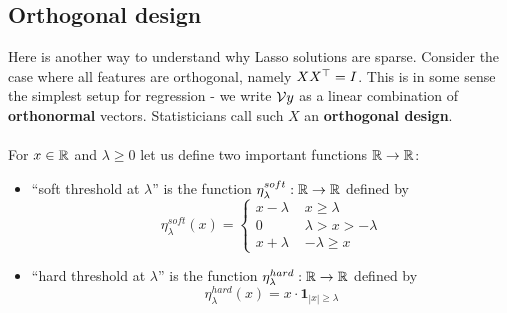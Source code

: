 \subsection{Orthogonal design}

Here is another way to understand why Lasso solutions are sparse.
Consider the case where all features are orthogonal, namely $XX^{\top}=I$. This is
in some sense the simplest setup for regression - we write $\mathcal{V}{y}$ as a linear
combination of {\bf orthonormal} vectors.
Statisticians call such $X$ an {\bf orthogonal design}.
\\~\\
 For $x\in\mathbb{R}$ and $\lambda\geq 0$ let us define two important functions
 $\mathbb{R}\to\mathbb{R}$: 
 \begin{itemize}
        \item ``soft threshold at $\lambda$''
          is the function $\eta^{soft}_\lambda:\mathbb{R}\to\mathbb{R}$ defined by
          \[
            \eta^{soft}_\lambda(x) = 
\begin{cases}
  x-\lambda \,\,& x\geq \lambda \\
  0 \,\,& \lambda > x > -\lambda \\
  x+\lambda \,\,& -\lambda\geq x
\end{cases}
          \]
        \item
          ``hard threshold at $\lambda$'' is the function 
          $ \eta^{hard}_\lambda:\mathbb{R}\to\mathbb{R}$ defined by
          \[
            \eta^{hard}_\lambda(x) = x\cdot \mathbf{1}_{|x|\geq \lambda}
            \]
      \end{itemize}

